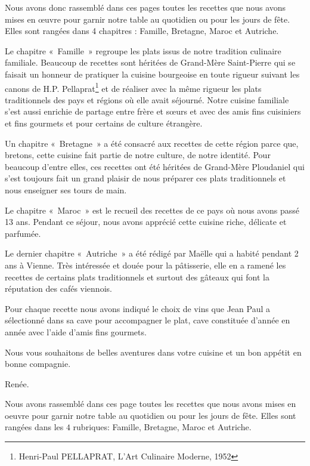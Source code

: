 Nous avons donc rassemblé dans ces pages toutes les recettes que nous avons mises en œuvre pour garnir notre table au quotidien ou pour les jours de fête. Elles sont rangées dans 4 chapitres : Famille, Bretagne, Maroc et Autriche.

Le chapitre « Famille » regroupe les plats issus de notre tradition culinaire familiale. Beaucoup de recettes sont héritées de Grand-Mère Saint-Pierre qui se faisait un honneur de pratiquer la cuisine bourgeoise en toute rigueur suivant les canons de H.P. Pellaprat\footnote{Henri-Paul PELLAPRAT, L’Art Culinaire Moderne, 1952} et de réaliser avec la même rigueur les plats traditionnels des pays et régions où elle avait séjourné. Notre cuisine familiale s’est aussi enrichie de partage entre frère et sœurs et avec des amis fins cuisiniers et fins gourmets et pour certains de culture étrangère.

Un chapitre « Bretagne » a été consacré aux recettes de cette région parce que, bretons, cette cuisine fait partie de notre culture, de notre identité. Pour beaucoup d’entre elles, ces recettes ont été héritées de Grand-Mère Ploudaniel qui s’est toujours fait un grand plaisir de nous préparer ces plats traditionnels et nous enseigner ses tours de main. 

Le chapitre « Maroc » est le recueil des recettes de ce pays où nous avons passé 13 ans. Pendant ce séjour, nous avons apprécié cette cuisine riche, délicate et parfumée.

Le dernier chapitre « Autriche » a été rédigé par Maëlle qui a habité pendant 2 ans à Vienne. Très intéressée et douée pour la pâtisserie, elle en a ramené les recettes de certains plats traditionnels et surtout des gâteaux qui font la réputation des cafés viennois.
    
Pour chaque recette nous avons indiqué le choix de vins que Jean Paul a sélectionné dans sa cave pour accompagner le plat, cave constituée d'année en année avec l'aide d'amis fins gourmets. 

Nous vous souhaitons de belles aventures dans votre cuisine et un bon appétit en bonne compagnie.

\vspace{16pt}
\hfill
\parbox{2cm}{
Renée. 
}

\iffalse
Nous avons rassemblé dans ces page toutes les recettes que nous avons mises en oeuvre pour garnir notre table au quotidien ou pour les jours de fête. Elles sont rangées dans les $4$ rubriques: Famille, Bretagne, Maroc et Autriche. 

